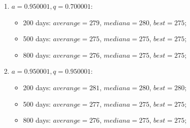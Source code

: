 \begin{enumerate}
\begin{enumerate}
\begin{itemize}
		\end{itemize}
		\item $a= 0.950001, q= 0.700001$:
		\begin{itemize}
			\item 200 days: $averange = 279$, $mediana = 280$, $best = 275$;
			\item 500 days: $averange = 275$, $mediana = 275$, $best = 275$;
			\item 800 days: $averange = 276$, $mediana = 275$, $best = 275$;
		\end{itemize}
		\item $a= 0.950001, q= 0.950001$:
		\begin{itemize}
			\item 200 days: $averange = 281$, $mediana = 280$, $best = 280$;
			\item 500 days: $averange = 277$, $mediana = 275$, $best = 275$;
			\item 800 days: $averange = 276$, $mediana = 275$, $best = 275$;
		\end{itemize}
	\end{enumerate}
\end{enumerate}
	